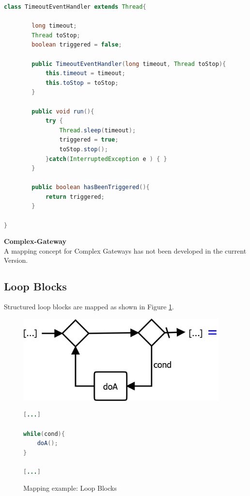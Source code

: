 \begin{lstlisting}[language=Java, caption=TimeoutEventHandler implementation as an inner class, label=list:timeoutEventHandler]
class TimeoutEventHandler extends Thread{
		
		long timeout;
		Thread toStop;
		boolean triggered = false;
		
		public TimeoutEventHandler(long timeout, Thread toStop){
			this.timeout = timeout;
			this.toStop = toStop;
		}
		
		public void run(){
			try {
				Thread.sleep(timeout);
				triggered = true;
				toStop.stop();
			}catch(InterruptedException e ) { }
		}
		
		public boolean hasBeenTriggered(){
			return triggered;
		}
		
}
\end{lstlisting}

\textbf{Complex-Gateway}\\
A mapping concept for Complex Gateways has not been developed in the current Version. \\

\subsection{Loop Blocks}
Structured loop blocks are mapped as shown in Figure \ref{fig:mapping_loop}.
\begin{figure}[h]
\begin{minipage}[c]{0.5\textwidth}
	\includegraphics[width=0.95\textwidth]{images/mapping/loop_block.png}
\end{minipage}
\begin{minipage}[c]{0.5\textwidth}
\begin{lstlisting}[language=Java]
[...]

while(cond){
	doA();
}

[...]
\end{lstlisting}
\end{minipage}
\caption{Mapping example: Loop Blocks }%
\label{fig:mapping_loop}%
\end{figure}

